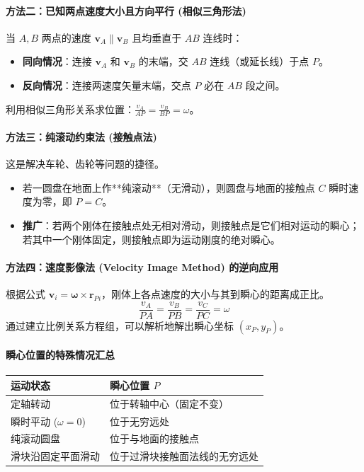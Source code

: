 \documentclass[12pt,a4paper]{article}
\newcommand{\vect}[1]{\mathbf{#1}}                   %
\begin{document}
\paragraph{方法二：已知两点速度大小且方向平行 (相似三角形法)}
当 $A, B$ 两点的速度 $\vect{v}_A \parallel \vect{v}_B$ 且均垂直于 $AB$ 连线时：
\begin{itemize}
    \item \textbf{同向情况}：连接 $\vect{v}_A$ 和 $\vect{v}_B$ 的末端，交 $AB$ 连线（或延长线）于点 $P$。
    \item \textbf{反向情况}：连接两速度矢量末端，交点 $P$ 必在 $AB$ 段之间。
\end{itemize}
利用相似三角形关系求位置：$\frac{v_A}{AP} = \frac{v_B}{BP} = \omega$。



\paragraph{方法三：纯滚动约束法 (接触点法)}
这是解决车轮、齿轮等问题的捷径。
\begin{itemize}
    \item 若一圆盘在地面上作**纯滚动**（无滑动），则圆盘与地面的接触点 $C$ 瞬时速度为零，即 $P = C$。
    \item \textbf{推广}：若两个刚体在接触点处无相对滑动，则接触点是它们相对运动的瞬心；若其中一个刚体固定，则接触点即为运动刚度的绝对瞬心。
\end{itemize}



\paragraph{方法四：速度影像法 (Velocity Image Method) 的逆向应用}
根据公式 $\vect{v}_i = \vect{\omega} \times \vect{r}_{Pi}$，刚体上各点速度的大小与其到瞬心的距离成正比。
\begin{equation}
    \frac{v_A}{PA} = \frac{v_B}{PB} = \frac{v_C}{PC} = \omega
\end{equation}
通过建立比例关系方程组，可以解析地解出瞬心坐标 $(x_P, y_P)$。

\paragraph{瞬心位置的特殊情况汇总}
\begin{longtable}{ll}
    \toprule
    \textbf{运动状态} & \textbf{瞬心位置 $P$} \\ \midrule
    定轴转动 & 位于转轴中心（固定不变） \\
    瞬时平动 ($\omega=0$) & 位于无穷远处 \\
    纯滚动圆盘 & 位于与地面的接触点 \\
    滑块沿固定平面滑动 & 位于过滑块接触面法线的无穷远处 \\ \bottomrule
\end{longtable}
\end{document}
